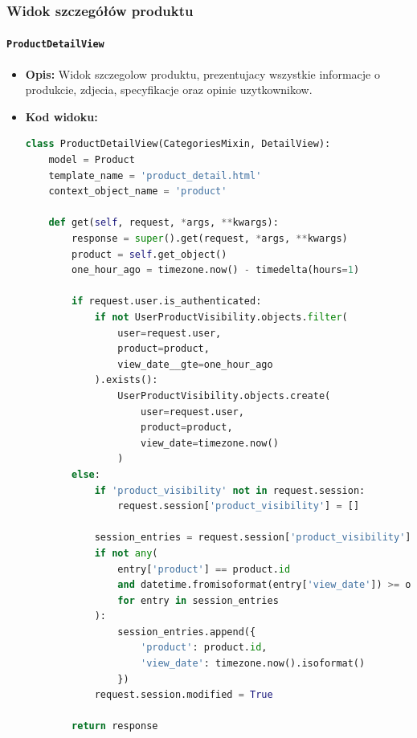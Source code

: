 \documentclass[12pt,a4paper,oneside]{article}
\theoremstyle{definition}
\numberwithin{equation}{section}
\begin{document}
\subsubsection*{Widok szczegółów produktu}

\paragraph{\texttt{ProductDetailView}}
\begin{itemize}
    \item \textbf{Opis:} Widok szczegolow produktu, prezentujacy wszystkie informacje o produkcie, zdjecia, specyfikacje oraz opinie uzytkownikow.
    \item \textbf{Kod widoku:}
\begin{lstlisting}[language=Python, caption=Kod widoku ProductDetailView]
class ProductDetailView(CategoriesMixin, DetailView):
    model = Product
    template_name = 'product_detail.html'
    context_object_name = 'product'

    def get(self, request, *args, **kwargs):
        response = super().get(request, *args, **kwargs)
        product = self.get_object()
        one_hour_ago = timezone.now() - timedelta(hours=1)

        if request.user.is_authenticated:
            if not UserProductVisibility.objects.filter(
                user=request.user,
                product=product,
                view_date__gte=one_hour_ago
            ).exists():
                UserProductVisibility.objects.create(
                    user=request.user, 
                    product=product, 
                    view_date=timezone.now()
                )
        else:
            if 'product_visibility' not in request.session:
                request.session['product_visibility'] = []

            session_entries = request.session['product_visibility']
            if not any(
                entry['product'] == product.id 
                and datetime.fromisoformat(entry['view_date']) >= one_hour_ago
                for entry in session_entries
            ):
                session_entries.append({
                    'product': product.id,
                    'view_date': timezone.now().isoformat()
                })
            request.session.modified = True

        return response


\end{lstlisting}
\end{itemize}
\end{document}
